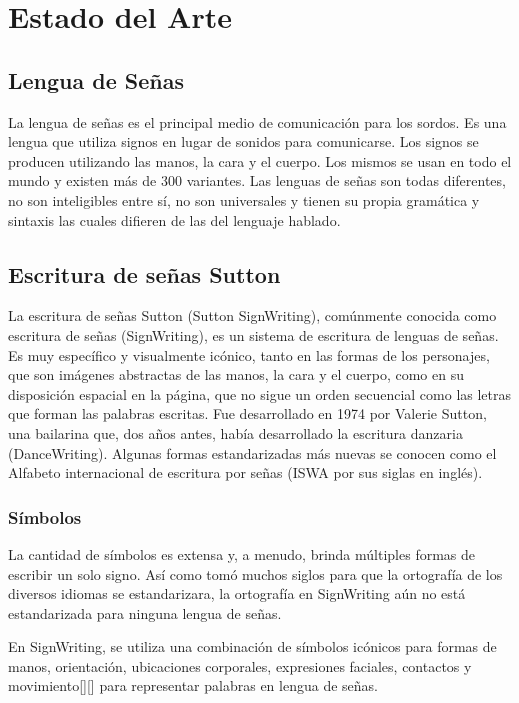 \chapter{Estado del Arte}\label{chapter:state-of-the-art}

\section{Lengua de Señas}\label{section:state-of-the-art:sl}
La lengua de señas es el principal medio de comunicación para los sordos. Es una lengua que utiliza signos en lugar de sonidos para comunicarse. Los signos se producen utilizando las manos, la cara y el cuerpo. Los mismos se usan en todo el mundo y existen más de 300 variantes.
Las lenguas de señas son todas diferentes, no son inteligibles entre sí, no son universales y tienen su propia gramática y sintaxis las cuales difieren de las del lenguaje hablado.

\section{Escritura de señas Sutton}\label{section:state-of-the-art:sw}
La escritura de señas Sutton (Sutton SignWriting), comúnmente conocida como escritura de señas (SignWriting), es un sistema de escritura de lenguas de señas. Es muy específico y visualmente icónico, tanto en las formas de los personajes, que son imágenes abstractas de las manos, la cara y el cuerpo, como en su disposición espacial en la página, que no sigue un orden secuencial como las letras que forman las palabras escritas. Fue desarrollado en 1974 por Valerie Sutton, una bailarina que, dos años antes, había desarrollado la escritura danzaria (DanceWriting). Algunas formas estandarizadas más nuevas se conocen como el Alfabeto internacional de escritura por señas (ISWA por sus siglas en inglés).

\subsection{Símbolos}\label{subsection:state-of-the-art:sl:symbols}
La cantidad de símbolos es extensa y, a menudo, brinda múltiples formas de escribir un solo signo. Así como tomó muchos siglos para que la ortografía de los diversos idiomas se estandarizara, la ortografía en SignWriting aún no está estandarizada para ninguna lengua de señas.

En SignWriting, se utiliza una combinación de símbolos icónicos para formas de manos, orientación, ubicaciones corporales, expresiones faciales, contactos y movimiento[\cite{thiessen2011signwriting}][\cite{suttonsignwriting}] para representar palabras en lengua de señas.

